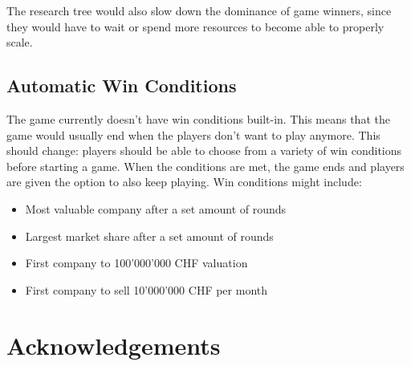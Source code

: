 The research tree would also slow down the dominance of game winners, since they would have to wait or spend more resources to
become able to properly scale.

\subsection{Automatic Win Conditions}

The game currently doesn't have win conditions built-in. This means that the game would usually end when the players don't want to play anymore.
This should change: players should be able to choose from a variety of win conditions before starting a game. When
the conditions are met, the game ends and players are given the option to also keep playing. Win conditions might include:

\begin{itemize}
	\item Most valuable company after a set amount of rounds
	\item Largest market share after a set amount of rounds
	\item First company to 100'000'000 CHF valuation
	\item First company to sell 10'000'000 CHF per month
\end{itemize}

\clearpage


\clearpage


\clearpage
\section{Acknowledgements}

\vspace*{\fill}

